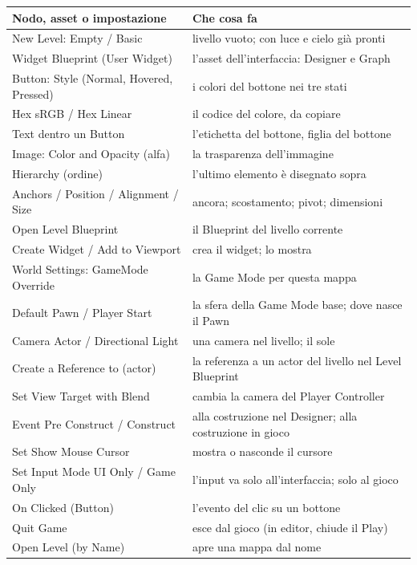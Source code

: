 \begin{table}[htbp]
\centering
\footnotesize
\begin{tabular}{@{}p{5.8cm}p{8.2cm}@{}}
\toprule
\textbf{Nodo, asset o impostazione} & \textbf{Che cosa fa} \\
\midrule
New Level: Empty / Basic & livello vuoto; con luce e cielo già pronti \\
Widget Blueprint (User Widget) & l'asset dell'interfaccia: Designer e Graph \\
Button: Style (Normal, Hovered, Pressed) & i colori del bottone nei tre stati \\
Hex sRGB / Hex Linear & il codice del colore, da copiare \\
Text dentro un Button & l'etichetta del bottone, figlia del bottone \\
Image: Color and Opacity (alfa) & la trasparenza dell'immagine \\
Hierarchy (ordine) & l'ultimo elemento è disegnato sopra \\
Anchors / Position / Alignment / Size & ancora; scostamento; pivot; dimensioni \\
Open Level Blueprint & il Blueprint del livello corrente \\
Create Widget / Add to Viewport & crea il widget; lo mostra \\
World Settings: GameMode Override & la Game Mode per questa mappa \\
Default Pawn / Player Start & la sfera della Game Mode base; dove nasce il Pawn \\
Camera Actor / Directional Light & una camera nel livello; il sole \\
Create a Reference to (actor) & la referenza a un actor del livello nel Level Blueprint \\
Set View Target with Blend & cambia la camera del Player Controller \\
Event Pre Construct / Construct & alla costruzione nel Designer; alla costruzione in gioco \\
Set Show Mouse Cursor & mostra o nasconde il cursore \\
Set Input Mode UI Only / Game Only & l'input va solo all'interfaccia; solo al gioco \\
On Clicked (Button) & l'evento del clic su un bottone \\
Quit Game & esce dal gioco (in editor, chiude il Play) \\
Open Level (by Name) & apre una mappa dal nome \\

\end{tabular}
\end{table}
